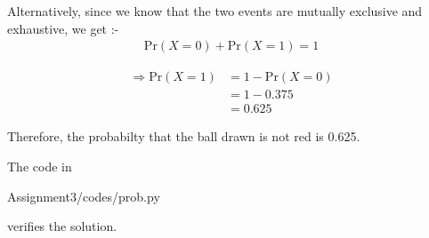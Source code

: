 \documentclass{beamer}
\begin{document}
\begin{frame}

Alternatively, since we know that the two events are mutually exclusive and exhaustive, we get :-
\begin{align}
\text{Pr} (X = 0) + \text{Pr} (X = 1) = 1
\end{align}

\begin{align}
\Rightarrow \text{Pr} (X = 1) &= 1 - \text{Pr} (X = 0) \\
&= 1 - 0.375 \\
&= 0.625
\end{align}

Therefore, the probabilty that the ball drawn is not red is 0.625.

\end{frame}

\begin{frame}

The code in
\begin{block}{}
Assignment3/codes/prob.py
\end{block}
verifies the solution.

\end{frame}
\end{document}
